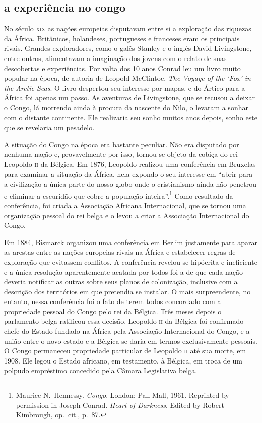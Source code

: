 \subsection{a experiência no congo}

No século \textsc{xix} as nações europeias disputavam entre si a exploração das
riquezas da África. Britânicos, holandeses, portugueses e franceses
eram os principais rivais. Grandes exploradores, como o galês Stanley e
o inglês David Livingstone, entre outros, alimentavam a imaginação dos
jovens com o relato de suas descobertas e experiências. Por volta dos
10 anos Conrad leu um livro muito popular na época, de autoria de
Leopold  McClintoc, \textit{The Voyage of the `Fox' in the Arctic
Seas}. O livro despertou seu interesse por mapas, e do Ártico para a
África foi apenas um passo. As aventuras de Livingstone, que se recusou
a deixar o Congo, lá morrendo ainda à procura da nascente do Nilo, o
levaram a sonhar com o distante continente. Ele realizaria seu sonho
muitos anos depois, sonho este que se revelaria um pesadelo.

A situação do Congo na época era bastante peculiar. Não era
disputado por  nenhuma nação e, provavelmente por isso, tornou{}-se
objeto da cobiça do rei Leopoldo \textsc{ii} da Bélgica. Em 1876, Leopoldo
realizou uma conferência em Bruxelas para examinar a situação da
África, nela expondo o seu interesse em ``abrir para a civilização a
única parte do nosso globo onde o cristianismo ainda não penetrou e
eliminar a escuridão que cobre a população \mbox{inteira}''.\footnote{ Maurice 
N.~Hennessy. \textit{Congo}. London: Pall Mall, 1961. Reprinted by
permission in Joseph Conrad. \textit{Heart of Darkness}. Edited by
Robert Kimbrough, op.~cit., p.~87.} 
Como resultado da conferência, foi criada a Associação Africana
Internacional, que se tornou uma organização pessoal do rei belga e o
levou a criar a Associação Internacional do Congo.


Em 1884, Bismarck organizou uma conferência em Berlim justamente para
aparar as arestas entre as nações europeias rivais na África e
estabelecer regras de exploração que evitassem conflitos. A conferência
revelou{}-se hipócrita e ineficiente e a única resolução aparentemente
acatada por todos foi a de que cada nação deveria notificar as outras
sobre seus planos de colonização, inclusive com a descrição dos
territórios em que pretendia se instalar.  O mais surpreendente, no
entanto, nessa conferência foi o fato de terem todos concordado com a
propriedade pessoal do Congo pelo rei da Bélgica. Três meses depois o
parlamento belga ratificou essa decisão. Leopoldo \textsc{ii} da Bélgica foi
confirmado chefe do Estado fundado na África pela Associação Internacional do Congo, 
e a união entre o novo estado e a Bélgica se
daria em termos exclusivamente pessoais. O Congo permaneceu propriedade
particular de Leopoldo \textsc{ii} até sua morte, em 1908. Ele legou o Estado
africano, em  testamento, à Bélgica, em troca de um polpudo empréstimo
concedido pela Câmara Legislativa belga.


